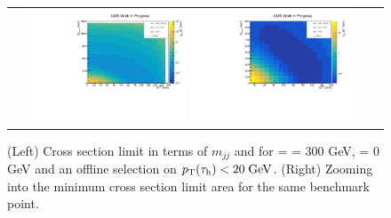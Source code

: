 \begin{figure}[tbh!]
	\centering
	\begin{tabular}{cc}
		\includegraphics[width=0.45\textwidth]{analysis/pics/JetInvMass_vs_MET_xsec_chi300_lsp000_taupt20.pdf}
		\includegraphics[width=0.45\textwidth]{analysis/pics/JetInvMass_vs_MET_xsec_chi300_lsp000_taupt20_zoom.pdf} 		
	\end{tabular}
	\caption{(Left) Cross section limit in terms of $m_{jj}$ and \met for \charginopm = \neutralinotwo = 300 GeV, \neutralinoone = 0 GeV and an offline selection on $p_{\text{T}}(\tau_{\text{h}}) <  20\;\text{Ge}\kern-0.06667em\text{V}$. (Right) Zooming into the minimum cross section limit area for the same benchmark point.}
	\label{fig::JetInvMass_vs_MET_xsec_chi300_lsp000_taupt20}
\end{figure}

